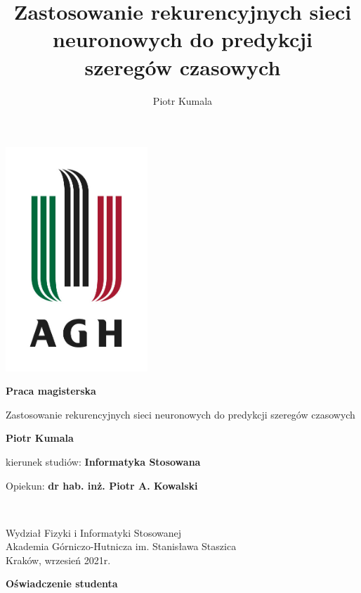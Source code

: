 \documentclass[10pt,a4paper]{article}
\author{Piotr Kumala}
\title{Zastosowanie rekurencyjnych sieci neuronowych do predykcji szeregów czasowych}
\date{}
\begin{document}
\begin{titlepage}
	\begin{center}
		\includegraphics[width=0.4\textwidth]{img/university.jpg}
		\vspace*{1cm}
		
		{\Huge
			\textbf{Praca magisterska} \\
			
		}
		\vspace{0.5cm}
		{\Large
			Zastosowanie rekurencyjnych sieci neuronowych do predykcji szeregów czasowych
			
			\vspace{1cm}
			
			\textbf{Piotr Kumala} \\
		}
		\vspace{0.5cm}
		kierunek studiów: \textbf{Informatyka Stosowana} \\
		
		\vspace{1cm}
		
		{\Large Opiekun: \textbf{dr hab. inż. Piotr A. Kowalski}}
		\vfill
		
		\
		\vspace{0.8cm}
		
		
		Wydział Fizyki i Informatyki Stosowanej\\
		Akademia Górniczo-Hutnicza im. Stanisława Staszica\\
		Kraków, wrzesień 2021r.
		
	\end{center}
\end{titlepage}
\newpage
\begin{center}
	\textbf{Oświadczenie studenta}
\end{center}
\end{document}
